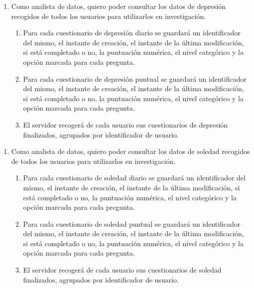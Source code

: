         \begin{enumerate}[resume=req-usuario,label=\textbf{\texttt{RU-\arabic*}}]
            \item Como analista de datos, quiero poder consultar los datos de depresión recogidos  de todos los usuarios para utilizarlos en investigación.
            \begin{enumerate}[resume=req-funcionales,label=\textbf{\texttt{RF-\arabic*}}]
                 \item Para cada cuestionario de depresión diario se guardará un identificador del mismo, el instante de creación, el instante de la última modificación, si está completado o no, la puntuación numérica, el nivel categórico y la opción marcada para cada pregunta.
                \item Para cada cuestionario de depresión puntual se guardará un identificador del mismo, el instante de creación, el instante de la última modificación, si está completado o no, la puntuación numérica, el nivel categórico y la opción marcada para cada pregunta.
                \item El servidor recogerá de cada usuario sus cuestionarios de depresión finalizados, agrupados por identificador de usuario.
            \end{enumerate}
        \end{enumerate}
        \begin{enumerate}[resume=req-usuario,label=\textbf{\texttt{RU-\arabic*}}]
            \item Como analista de datos, quiero poder consultar los datos de soledad recogidos de todos los usuarios  para utilizarlos en investigación.
            \begin{enumerate}[resume=req-funcionales,label=\textbf{\texttt{RF-\arabic*}}]
                \item Para cada cuestionario de soledad diario se guardará un identificador del mismo, el instante de creación, el instante de la última modificación, si está completado o no, la puntuación numérica, el nivel categórico y la opción marcada para cada pregunta.
                \item Para cada cuestionario de soledad puntual se guardará un identificador del mismo, el instante de creación, el instante de la última modificación, si está completado o no, la puntuación numérica, el nivel categórico y la opción marcada para cada pregunta.
                \item El servidor recogerá de cada usuario sus cuestionarios de soledad finalizados, agrupados por identificador de usuario.
            \end{enumerate}
        \end{enumerate}
